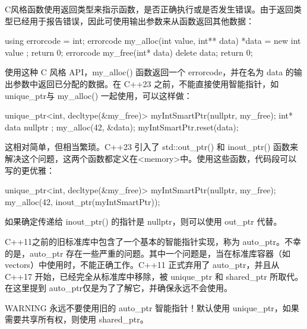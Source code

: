 

C风格函数使用返回类型来指示函数，是否正确执行或是否发生错误。由于返回类型已经用于报告错误，因此可使用输出参数来从函数返回其他数据：

\begin{cpp}
using errorcode = int;
errorcode my_alloc(int value, int** data) { *data = new int { value }; return 0; }
errorcode my_free(int* data) { delete data; return 0; }
\end{cpp}

使用这种 C 风格 API，my\_alloc() 函数返回一个 errorcode，并在名为 data 的输出参数中返回已分配的数据。在 C++23 之前，不能直接使用智能指针，如 unique\_ptr与 my\_alloc() 一起使用，可以这样做：

\begin{cpp}
unique_ptr<int, decltype(&my_free)> myIntSmartPtr(nullptr, my_free);
int* data { nullptr };
my_alloc(42, &data);
myIntSmartPtr.reset(data);
\end{cpp}

这相对简单，但相当繁琐。C++23 引入了 std::out\_ptr() 和 inout\_ptr() 函数来解决这个问题，这两个函数都定义在<memory>中。使用这些函数，代码段可以写的更优雅：

\begin{cpp}
unique_ptr<int, decltype(&my_free)> myIntSmartPtr(nullptr, my_free);
my_alloc(42, inout_ptr(myIntSmartPtr));
\end{cpp}

如果确定传递给 inout\_ptr() 的指针是 nullptr，则可以使用 out\_ptr 代替。


C++11之前的旧标准库中包含了一个基本的智能指针实现，称为 auto\_ptr。不幸的是，auto\_ptr 存在一些严重的问题。其中一个问题是，当在标准库容器（如 vectors）中使用时，不能正确工作。C++11 正式弃用了 auto\_ptr，并且从 C++17 开始，已经完全从标准库中移除，被 unique\_ptr 和 shared\_ptr 所取代。在这里提到 auto\_ptr仅是为了了解它，并确保永远不会使用。

\begin{myWarning}{WARNING}
永远不要使用旧的 auto\_ptr 智能指针！默认使用 unique\_ptr，如果需要共享所有权，则使用 shared\_ptr。
\end{myWarning}
